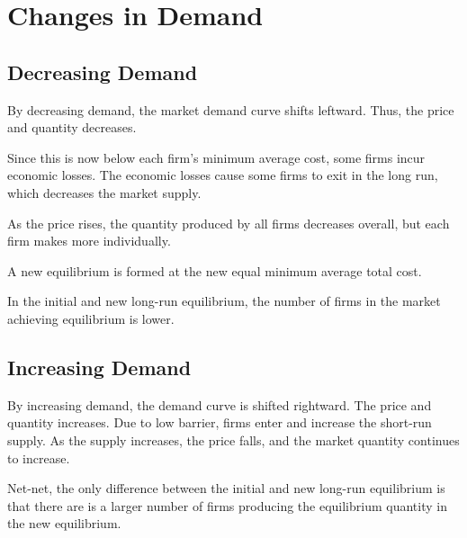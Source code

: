             \section{Changes in Demand} %
            \label{sec:changes_in_demand}
                \subsection{Decreasing Demand} %
                \label{sub:decreasing_demand}

                    By decreasing demand, the market demand curve shifts leftward.
                    Thus, the price and quantity decreases.

                    Since this is now below each firm's minimum average cost, some firms incur economic losses.
                    The economic losses cause some firms to exit in the long run, which decreases the market supply.

                    As the price rises, the quantity produced by all firms decreases overall, but each firm makes more individually.

                    A new equilibrium is formed at the new equal minimum average total cost.

                    In the initial and new long-run equilibrium, the number of firms in the market achieving equilibrium is lower.
                \subsection{Increasing Demand} %
                \label{sub:increasing_demand}
                    By increasing demand, the demand curve is shifted rightward.
                    The price and quantity increases.
                    Due to low barrier, firms enter and increase the short-run supply.
                    As the supply increases, the price falls, and the market quantity continues to increase.

                    Net-net, the only difference between the initial and new long-run equilibrium is that there are is a larger number of firms producing the equilibrium quantity in the new equilibrium.
